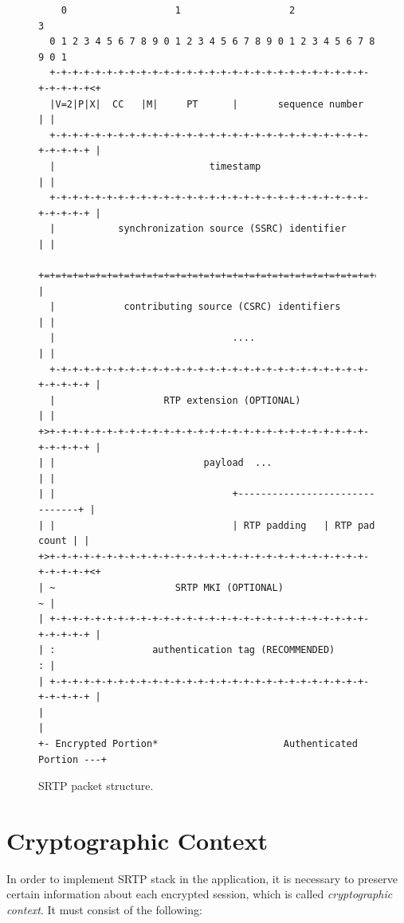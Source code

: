 \begin{figure}[H]
\centering
\begin{verbatim}
    0                   1                   2                   3
  0 1 2 3 4 5 6 7 8 9 0 1 2 3 4 5 6 7 8 9 0 1 2 3 4 5 6 7 8 9 0 1
  +-+-+-+-+-+-+-+-+-+-+-+-+-+-+-+-+-+-+-+-+-+-+-+-+-+-+-+-+-+-+-+-+<+
  |V=2|P|X|  CC   |M|     PT      |       sequence number         | |
  +-+-+-+-+-+-+-+-+-+-+-+-+-+-+-+-+-+-+-+-+-+-+-+-+-+-+-+-+-+-+-+-+ |
  |                           timestamp                           | |
  +-+-+-+-+-+-+-+-+-+-+-+-+-+-+-+-+-+-+-+-+-+-+-+-+-+-+-+-+-+-+-+-+ |
  |           synchronization source (SSRC) identifier            | |
  +=+=+=+=+=+=+=+=+=+=+=+=+=+=+=+=+=+=+=+=+=+=+=+=+=+=+=+=+=+=+=+=+ |
  |            contributing source (CSRC) identifiers             | |
  |                               ....                            | |
  +-+-+-+-+-+-+-+-+-+-+-+-+-+-+-+-+-+-+-+-+-+-+-+-+-+-+-+-+-+-+-+-+ |
  |                   RTP extension (OPTIONAL)                    | |
+>+-+-+-+-+-+-+-+-+-+-+-+-+-+-+-+-+-+-+-+-+-+-+-+-+-+-+-+-+-+-+-+-+ |
| |                          payload  ...                         | |
| |                               +-------------------------------+ |
| |                               | RTP padding   | RTP pad count | |
+>+-+-+-+-+-+-+-+-+-+-+-+-+-+-+-+-+-+-+-+-+-+-+-+-+-+-+-+-+-+-+-+-+<+
| ~                     SRTP MKI (OPTIONAL)                       ~ |
| +-+-+-+-+-+-+-+-+-+-+-+-+-+-+-+-+-+-+-+-+-+-+-+-+-+-+-+-+-+-+-+-+ |
| :                 authentication tag (RECOMMENDED)              : |
| +-+-+-+-+-+-+-+-+-+-+-+-+-+-+-+-+-+-+-+-+-+-+-+-+-+-+-+-+-+-+-+-+ |
|                                                                   |
+- Encrypted Portion*                      Authenticated Portion ---+
\end{verbatim}
\caption[SRTP packet structure]{SRTP packet structure.}
\end{figure}

\section{Cryptographic Context}
In order to implement SRTP stack in the application, it is necessary to
preserve certain information about each encrypted session, which is 
called \textit{cryptographic context}. It must consist of the following:

